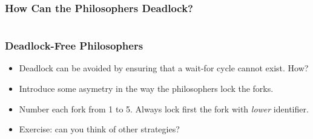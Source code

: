 \begin{frame}
  \frametitle{How Can the Philosophers Deadlock?}

  \begin{columns}
    \begin{column}{.6\textwidth}
    \end{column}
    \begin{column}{.39\textwidth}
    \end{column}
  \end{columns}
\end{frame}


\begin{frame}
  \frametitle{Deadlock-Free Philosophers}
  \begin{itemize}
    \item[] Deadlock can be avoided by ensuring that a wait-for cycle cannot
      exist. \alert{How?}
      \vspace{1cm}
    \item[] Introduce some asymetry in the way the philosophers lock the forks.
    \item[] Number each fork from 1 to 5. Always lock first the
      fork with \emph{lower} identifier.
      \vspace{1cm}
    \item[] Exercise: \alert{can you think of other strategies?}
  \end{itemize}
\end{frame}

